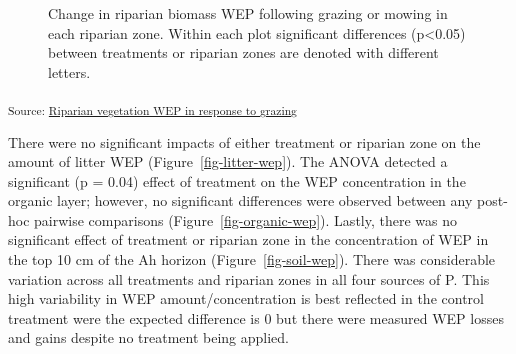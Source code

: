 \documentclass[
]{agujournal2019}
\begin{document}
\begin{figure}[H]


\caption{\label{fig-vegetation-wep}Change in riparian biomass WEP
following grazing or mowing in each riparian zone. Within each plot
significant differences (p\textless0.05) between treatments or riparian
zones are denoted with different letters.}

\end{figure}%

\textsubscript{Source:
\href{https://alex-koiter.github.io/riparian-grazing-manuscript/notebooks/01_Biomass_analysis-preview.html\#cell-fig-vegetation-WEP}{Riparian
vegetation WEP in response to grazing}}

There were no significant impacts of either treatment or riparian zone
on the amount of litter WEP (Figure~\ref{fig-litter-wep}). The ANOVA
detected a significant (p = 0.04) effect of treatment on the WEP
concentration in the organic layer; however, no significant differences
were observed between any post-hoc pairwise comparisons
(Figure~\ref{fig-organic-wep}). Lastly, there was no significant effect
of treatment or riparian zone in the concentration of WEP in the top 10
cm of the Ah horizon (Figure~\ref{fig-soil-wep}). There was considerable
variation across all treatments and riparian zones in all four sources
of P. This high variability in WEP amount/concentration is best
reflected in the control treatment were the expected difference is 0 but
there were measured WEP losses and gains despite no treatment being
applied.
\end{document}
